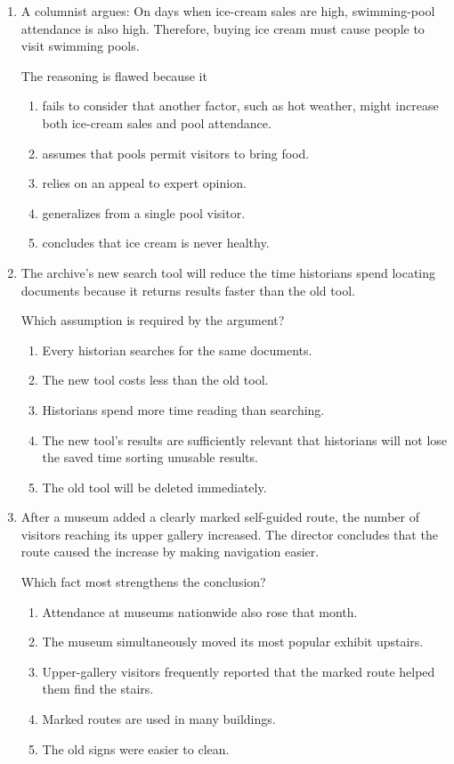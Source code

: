 \begin{enumerate}
\item A columnist argues: On days when ice-cream sales are high, swimming-pool attendance is also high. Therefore, buying ice cream must cause people to visit swimming pools.

The reasoning is flawed because it
\begin{enumerate}
\item[(A)] fails to consider that another factor, such as hot weather, might increase both ice-cream sales and pool attendance.
\item[(B)] assumes that pools permit visitors to bring food.
\item[(C)] relies on an appeal to expert opinion.
\item[(D)] generalizes from a single pool visitor.
\item[(E)] concludes that ice cream is never healthy.
\end{enumerate}

\item The archive's new search tool will reduce the time historians spend locating documents because it returns results faster than the old tool.

Which assumption is required by the argument?
\begin{enumerate}
\item[(A)] Every historian searches for the same documents.
\item[(B)] The new tool costs less than the old tool.
\item[(C)] Historians spend more time reading than searching.
\item[(D)] The new tool's results are sufficiently relevant that historians will not lose the saved time sorting unusable results.
\item[(E)] The old tool will be deleted immediately.
\end{enumerate}

\item After a museum added a clearly marked self-guided route, the number of visitors reaching its upper gallery increased. The director concludes that the route caused the increase by making navigation easier.

Which fact most strengthens the conclusion?
\begin{enumerate}
\item[(A)] Attendance at museums nationwide also rose that month.
\item[(B)] The museum simultaneously moved its most popular exhibit upstairs.
\item[(C)] Upper-gallery visitors frequently reported that the marked route helped them find the stairs.
\item[(D)] Marked routes are used in many buildings.
\item[(E)] The old signs were easier to clean.
\end{enumerate}


\end{enumerate}
